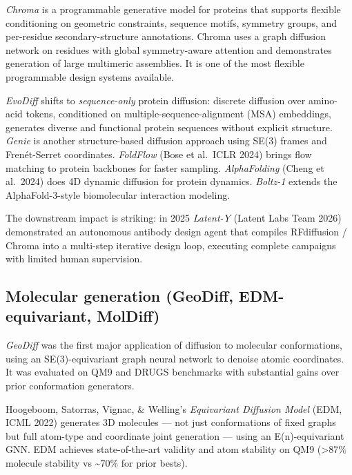 \documentclass{article}
\begin{document}
\emph{Chroma} \citep{ingraham20232023} is a programmable generative model for proteins that supports flexible conditioning on geometric constraints, sequence motifs, symmetry groups, and per-residue secondary-structure annotations. Chroma uses a graph diffusion network on residues with global symmetry-aware attention and demonstrates generation of large multimeric assemblies. It is one of the most flexible programmable design systems available.

\emph{EvoDiff} \citep{alamdari20232023} shifts to \emph{sequence-only} protein diffusion: discrete diffusion over amino-acid tokens, conditioned on multiple-sequence-alignment (MSA) embeddings, generates diverse and functional protein sequences without explicit structure. \emph{Genie} \citep{lin2023diffusionmodelsfor} is another structure-based diffusion approach using SE(3) frames and Frenét-Serret coordinates. \emph{FoldFlow} (Bose et al.~ICLR 2024) brings flow matching to protein backbones for faster sampling. \emph{AlphaFolding} (Cheng et al.~2024) does 4D dynamic diffusion for protein dynamics. \emph{Boltz-1} \citep{wohlwend20242024} extends the AlphaFold-3-style biomolecular interaction modeling.

The downstream impact is striking: in 2025 \emph{Latent-Y} (Latent Labs Team 2026) demonstrated an autonomous antibody design agent that compiles RFdiffusion / Chroma into a multi-step iterative design loop, executing complete campaigns with limited human supervision.

\subsection{Molecular generation (GeoDiff, EDM-equivariant, MolDiff)}\label{molecular-generation-geodiff-edm-equivariant-moldiff}

\emph{GeoDiff} \citep{xu2022geodiffageometricd} was the first major application of diffusion to molecular conformations, using an SE(3)-equivariant graph neural network to denoise atomic coordinates. It was evaluated on QM9 and DRUGS benchmarks with substantial gains over prior conformation generators.

Hoogeboom, Satorras, Vignac, \& Welling's \emph{Equivariant Diffusion Model} (EDM, ICML 2022) generates 3D molecules --- not just conformations of fixed graphs but full atom-type and coordinate joint generation --- using an E(n)-equivariant GNN. EDM achieves state-of-the-art validity and atom stability on QM9 (\textgreater87\% molecule stability vs \textasciitilde70\% for prior bests).
\end{document}
